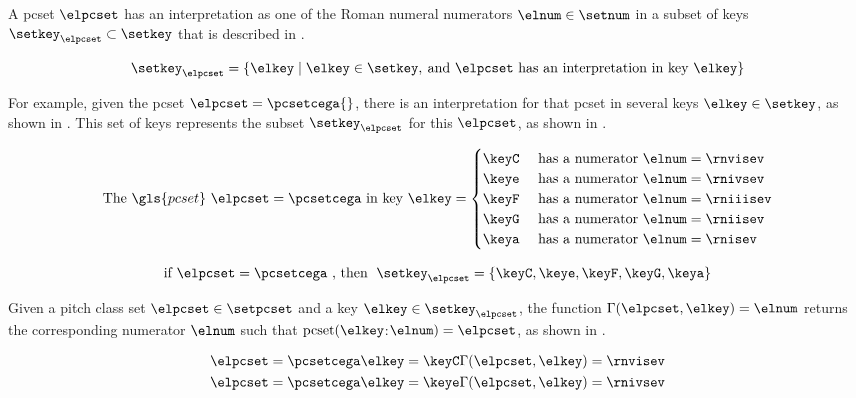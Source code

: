 
A \gls{pcset} $\elpcset$ has an interpretation as one of the
Roman numeral numerators $\elnum \in \setnum$ in a subset of
keys $\setkey_{\elpcset} \subset \setkey$ that is described
in .

\begin{equation}
    \label{eq:keys_for_pcset}
    \setkey_{\elpcset} = \{\elkey \mid \elkey \in \setkey,
     \: \text{and $\elpcset$ has an interpretation in key $\elkey$}\}
\end{equation}

For example, given the \gls{pcset} $\elpcset =
\pcsetcega{}$, there is an interpretation for that
\gls{pcset} in several keys $\elkey \in \setkey$, as shown
in . This set of keys represents the
subset $\setkey_\elpcset$ for this $\elpcset$, as shown in
. 

\begin{equation}
    \label{eq:pcset_cega}
    \text{The } \gls{pcset} \text{ } \elpcset = \pcsetcega \text{ in key } \elkey =
    \begin{cases}
        \keyC & \text{ has a numerator } \elnum = \rnvisev \\
        \keye & \text{ has a numerator } \elnum = \rnivsev \\
        \keyF & \text{ has a numerator } \elnum = \rniiisev \\
        \keyG & \text{ has a numerator } \elnum = \rniisev \\
        \keya & \text{ has a numerator } \elnum = \rnisev \\
    \end{cases}
\end{equation}

\begin{equation}
    \label{eq:keys_for_pcset_example}
    \text{if } \elpcset = \pcsetcega \text{ , then } \; 
    \setkey_{\elpcset} = \{ \keyC, \keye, \keyF, \keyG, \keya \}
\end{equation}

Given a pitch class set $\elpcset \in \setpcset$ and a key
$\elkey \in \setkey_\elpcset$, the function
$\Gamma(\elpcset, \elkey) = \elnum$ returns the
corresponding numerator $\elnum$ such that
$\text{pcset}(\elkey$:$\elnum) = \elpcset$, as shown in
.

\begin{equation}
    \label{eq:numerator_from_pcset_key}
    \begin{split}
        \elpcset = \pcsetcega \elkey = \keyC \Gamma(\elpcset, \elkey) = \rnvisev \\
        \elpcset = \pcsetcega \elkey = \keye \Gamma(\elpcset, \elkey) = \rnivsev \\
    \end{split}
\end{equation}


